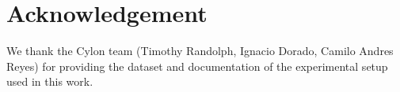 \section*{Acknowledgement}

We thank the Cylon team (Timothy Randolph, Ignacio Dorado, Camilo Andres Reyes) for providing the dataset and documentation of the experimental setup used in this work.
